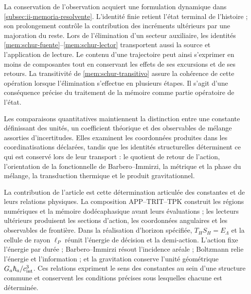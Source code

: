 La conservation de l'observation acquiert une formulation dynamique dans
\ref{subsec:ii-memoria-resolvente}. L'identité finie retient l'état
terminal de l'histoire ; son prolongement contrôle la contribution des
incréments ultérieurs par une majoration du reste. Lors de l'élimination
d'un secteur auxiliaire, les identités
\eqref{mem:schur-fuente}--\eqref{mem:schur-lector} transportent aussi
la source et l'application de lecture. Le contenu d'une trajectoire
peut ainsi s'exprimer en moins de composantes tout en conservant les effets de
ses excursions et de ses retours. La transitivité de
\eqref{mem:schur-transitivo} assure la cohérence de cette opération
lorsque l'élimination s'effectue en plusieurs étapes. Il s'agit d'une
conséquence précise du traitement de la mémoire comme partie opératoire de l'état.



Les comparaisons quantitatives maintiennent la distinction entre une
constante définissant des unités, un coefficient théorique et des observables
de mélange assorties d’incertitudes. Elles examinent les coordonnées produites dans
les coordinatisations déclarées, tandis que les identités structurelles déterminent
ce qui est conservé lors de leur transport : le quotient de retour de l’action,
l’orientation de la fonctionnelle de Barbero--Immirzi, la métrique et la phase
du mélange, la transduction thermique et le produit gravitationnel.

La contribution de l’article est cette détermination articulée des
constantes et de leurs relations physiques. La composition APP--TRIT--TPK
construit les régions numériques et la mémoire dodécaphasique avant leurs
évaluations ; les lecteurs ultérieurs produisent les sections d’action,
les coordonnées angulaires et les observables de frontière. Dans la réalisation
d’horizon spécifiée, \(T_HS_H=E_\Lambda\) et la cellule de rayon
\(\ell_P\) réunit l’énergie de décision et la demi-action. L’action fixe
l’énergie par durée ; Barbero--Immirzi résout l’incidence aréale ;
Boltzmann relie l’énergie et l’information ; et la gravitation conserve
l’unité géométrique \(G_a\hbar_a/c_{\rm int}^3\).
Ces relations expriment le sens des constantes au sein
d’une structure commune et conservent les conditions précises sous lesquelles
chacune est déterminée.
